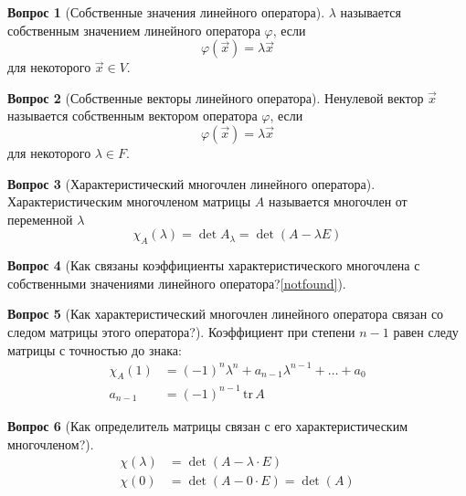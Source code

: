 \documentclass[a4paper,11pt]{article}
\theoremstyle{remark}
\theoremstyle{definition}
\newtheorem{question}{Вопрос}
\begin{document}
\begin{question}[Собственные значения линейного оператора]
\(\lambda\) называется собственным значением линейного оператора \(\varphi\), если
\begin{equation*}
	\varphi(\vec{x}) = \lambda\vec{x}
\end{equation*}
для некоторого \(\vec{x} \in V\).
\end{question}


\begin{question}[Собственные векторы линейного оператора]
Ненулевой вектор \(\vec{x}\) называется собственным вектором оператора \(\varphi\), если
\begin{equation*}
	\varphi(\vec{x}) = \lambda\vec{x}
\end{equation*}
для некоторого \(\lambda \in F\).
\end{question}


\begin{question}[Характеристический многочлен линейного оператора]
Характеристическим многочленом матрицы \(A\) называется многочлен от переменной \(\lambda\)
\begin{equation*}
	\chi_A(\lambda) = \det A_{\lambda} = \det (A - \lambda{}E)
\end{equation*}
\end{question}


\begin{question}[Как связаны коэффициенты характеристического многочлена с собственными значениями линейного оператора?\cref{notfound}]
\end{question}


\begin{question}[Как характеристический многочлен линейного оператора связан со следом матрицы этого оператора?]
Коэффициент при степени \(n-1\) равен следу матрицы с точностью до знака:
\begin{align*}
	\chi_A(1) &= (-1)^n\lambda^n + a_{n-1}\lambda^{n-1} + \dots + a_0 \\
	a_{n-1} &= (-1)^{n-1}\,\mathrm{tr}\,A
\end{align*}
\end{question}


\begin{question}[Как определитель матрицы связан с его характеристическим многочленом?]
\begin{align*}
	\chi(\lambda) &= \det (A - \lambda \cdot E)\\
	\chi(0) &= \det (A - 0 \cdot E) = \det (A)	
\end{align*}
\end{question}
\end{document}
